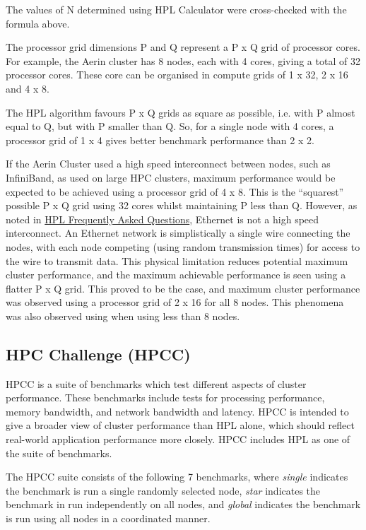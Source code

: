 The values of N determined using HPL Calculator were cross-checked with the formula above.

The processor grid dimensions P and Q represent a P x Q grid of processor cores. For example, the Aerin cluster has 8 nodes, each with 4 cores, giving a total of 32 processor cores. These core can be organised in compute grids of 1 x 32, 2 x 16 and 4 x 8.

The HPL algorithm favours P x Q grids as square as possible, i.e. with P almost equal to Q, but with P smaller than Q. So, for a single node with 4 cores, a processor grid of 1 x 4 gives better benchmark performance than 2 x 2.

If the Aerin Cluster used a high speed interconnect between nodes, such as InfiniBand, as used on large HPC clusters, maximum performance would be expected to be achieved using a processor grid of 4 x 8. This is the ``squarest'' possible P x Q grid using 32 cores whilst maintaining P less than Q. However, as noted in \href{https://www.netlib.org/benchmark/hpl/faqs.html}{HPL Frequently Asked Questions}, Ethernet is not a high speed interconnect. An Ethernet network is simplistically a single wire connecting the nodes, with each node competing (using random transmission times) for access to the wire to transmit data. This physical limitation reduces potential maximum cluster performance, and the maximum achievable performance is seen using a flatter P x Q grid. This proved to be the case, and maximum cluster performance was observed using a processor grid of 2 x 16 for all 8 nodes. This phenomena was also observed using when using less than 8 nodes.


%
%
\subsection{HPC Challenge (HPCC)}

HPCC is a suite of benchmarks which test different aspects of cluster performance. These benchmarks include tests for processing performance, memory bandwidth, and network bandwidth and latency. HPCC is intended to give a broader view of cluster performance than HPL alone, which should reflect real-world application performance more closely. HPCC includes HPL as one of the suite of benchmarks.

The HPCC suite consists of the following 7 benchmarks, where \emph{single} indicates the benchmark is run a single randomly selected node, \emph{star} indicates the benchmark in run independently on all nodes, and \emph{global} indicates the benchmark is run using all nodes in a coordinated manner. 


